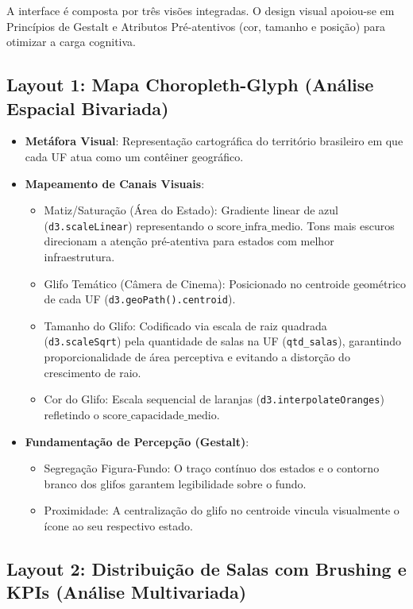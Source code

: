 \documentclass[12pt]{article}
\begin{document}
A interface é composta por três visões integradas. O design visual apoiou-se em Princípios de Gestalt 
e Atributos Pré-atentivos (cor, tamanho e posição) para otimizar a carga cognitiva.

\subsection{Layout 1: Mapa Choropleth-Glyph (Análise Espacial Bivariada)}

\begin{itemize}
    \item \textbf{Metáfora Visual}: Representação cartográfica do território brasileiro em que cada UF atua como um contêiner geográfico.
    \item \textbf{Mapeamento de Canais Visuais}:
          \begin{itemize}
              \item Matiz/Saturação (Área do Estado): Gradiente linear de azul (\texttt{d3.scaleLinear}) representando o $\text{score\_infra\_medio}$. Tons mais escuros direcionam a atenção pré-atentiva para estados com melhor infraestrutura. 
              \item Glifo Temático (Câmera de Cinema): Posicionado no centroide geométrico de cada UF (\texttt{d3.geoPath().centroid}).
              \item Tamanho do Glifo: Codificado via escala de raiz quadrada (\texttt{d3.scaleSqrt}) pela quantidade de salas na UF (\texttt{qtd\_salas}), garantindo proporcionalidade de área perceptiva e evitando a distorção do crescimento de raio.
              \item Cor do Glifo: Escala sequencial de laranjas (\texttt{d3.interpolateOranges}) refletindo o $\text{score\_capacidade\_medio}$.
          \end{itemize}
    \item \textbf{Fundamentação de Percepção (Gestalt)}:
          \begin{itemize}
              \item Segregação Figura-Fundo: O traço contínuo dos estados e o contorno branco dos glifos garantem legibilidade sobre o fundo.
              \item Proximidade: A centralização do glifo no centroide vincula visualmente o ícone ao seu respectivo estado.
          \end{itemize}
\end{itemize}

\subsection{Layout 2: Distribuição de Salas com Brushing e KPIs (Análise Multivariada)}
\end{document}
